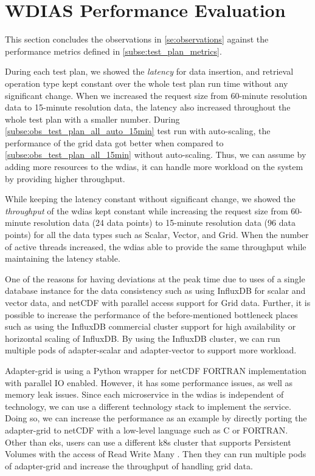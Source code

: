 \section{WDIAS Performance Evaluation}
\label{se:discussion}

This section concludes the observations in \cref{se:observations} against the performance metrics defined in \cref{subse:test_plan_metrics}.

During each test plan, we showed the \emph{latency} for data insertion, and retrieval operation type kept constant over the whole test plan run time without any significant change. When we increased the request size from 60-minute resolution data to 15-minute resolution data, the latency also increased throughout the whole test plan with a smaller number.
During \cref{subse:obs_test_plan_all_auto_15min} test run with auto-scaling, the performance of the grid data got better when compared to \cref{subse:obs_test_plan_all_15min} without auto-scaling. Thus, we can assume by adding more resources to the \acrshort{wdias}, it can handle more workload on the system by providing higher throughput.

While keeping the latency constant without significant change, we showed the \emph{throughput} of the \acrshort{wdias} kept constant while increasing the request size from 60-minute resolution data (24 data points) to 15-minute resolution data (96 data points) for all the data types such as Scalar, Vector, and Grid. When the number of active threads increased, the \acrshort{wdias} able to provide the same throughput while maintaining the latency stable.

One of the reasons for having deviations at the peak time due to uses of a single database instance for the data consistency such as using InfluxDB for scalar and vector data, and netCDF with parallel access support for Grid data. Further, it is possible to increase the performance of the before-mentioned bottleneck places such as using the InfluxDB commercial cluster support for high availability or horizontal scaling of InfluxDB. By using the InfluxDB cluster, we can run multiple pods of adapter-scalar and adapter-vector to support more workload.

Adapter-grid is using a Python wrapper for netCDF FORTRAN implementation with parallel IO enabled. However, it has some performance issues, as well as memory leak issues. Since each microservice in the \acrshort{wdias} is independent of technology, we can use a different technology stack to implement the service. Doing so, we can increase the performance as an example by directly porting the adapter-grid to netCDF with a low-level language such as C or FORTRAN. Other than \acrshort{eks}, users can use a different \acrshort{k8s} cluster that supports Persistent Volumes with the access of Read Write Many \cite{LinuxFoundationPersistentKubernetes}. Then they can run multiple pods of adapter-grid and increase the throughput of handling grid data.

